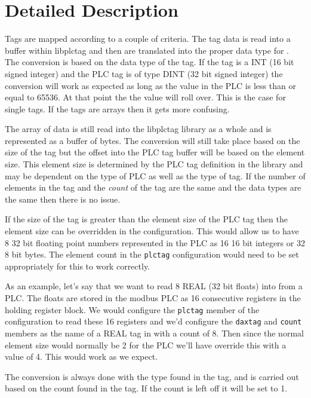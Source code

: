 \section{Detailed Description}

Tags are mapped according to a couple of criteria.  The tag data is
read into a buffer within libplctag and then are translated into the 
proper data type for \opendax{}.  The conversion is based on the data
type of the \opendax{} tag.  If the \opendax{} tag is a INT 
(16 bit signed integer) and the PLC tag is of type DINT (32 bit
signed integer) the conversion will work as expected as long as the
value in the PLC is less than or equal to 65536.  At that point the
the value will roll over.  This is the case for single tags.  If the
tags are arrays then it gets more confusing.

The array of data is still read into the libplctag library as a whole
and is represented as a buffer of bytes.  The conversion will still
take place based on the size of the \opendax{} tag but the offset into
the PLC tag buffer will be based on the element size.  This element
size is determined by the PLC tag definition in the library and may be
dependent on the type of PLC as well as the type of tag.  If the number
of elements in the tag and the \textit{count} of the \opendax{} tag are 
the same and the data types are the same then there is no issue.

If the size of the \opendax{} tag is greater than the element size of the
PLC tag then the element size can be overridden in the configuration.
This would allow us to have 8 32 bit floating point numbers represented
in the PLC as 16 16 bit integers or 32 8 bit bytes.  The element count
in the \texttt{plctag} configuration would need to be set appropriately
for this to work correctly.

As an example, let's say that we want to read 8 REAL (32 bit floats) into
\opendax{} from a \modbus{} PLC.  The floats are stored in the modbus PLC
as 16 consecutive registers in the holding register block.  We would
configure the \texttt{plctag} member of the configuration to read these
16 registers and we'd configure the \texttt{daxtag} and \texttt{count}
members as the name of a REAL tag in \opendax{} with a count of 8.  Then
since the normal element size would normally be 2 for the PLC we'll have
override this with a value of 4.  This would work as we expect.

The conversion is always done with the type found in the \opendax{} tag, and
is carried out based on the count found in the \opendax{} tag.  If the count
is left off it will be set to 1.

